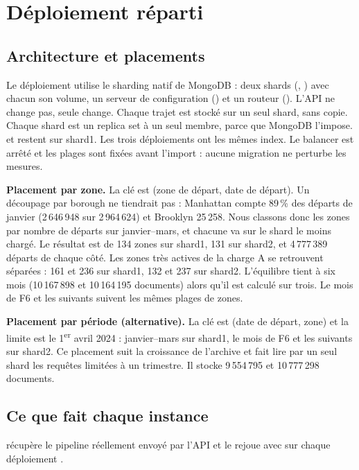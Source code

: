 \section{Déploiement réparti}\label{sec:reparti}
\subsection{Architecture et placements}
Le déploiement utilise le sharding natif de MongoDB : deux shards (,
) avec chacun son volume, un serveur de configuration () et un
routeur  (). L'API ne change pas, seule 
change. Chaque trajet est stocké sur un seul shard, sans copie. Chaque shard est un
replica set à un seul membre, parce que MongoDB l'impose.  et 
restent sur shard1. Les trois déploiements ont les mêmes index. Le balancer est arrêté
et les plages sont fixées avant l'import : aucune migration ne perturbe les mesures.

\textbf{Placement par zone.} La clé est (zone de départ, date de départ). Un découpage
par borough ne tiendrait pas : Manhattan compte 89\,\% des départs de janvier
(2\,646\,948 sur 2\,964\,624) et Brooklyn 25\,258. Nous classons donc les zones par
nombre de départs sur janvier--mars, et chacune va sur le shard le moins chargé. Le
résultat est de 134 zones sur shard1, 131 sur shard2, et 4\,777\,389 départs de chaque
côté. Les zones très actives de la charge A se retrouvent séparées : 161 et 236 sur
shard1, 132 et 237 sur shard2. L'équilibre tient à six mois (10\,167\,898 et 10\,164\,195
documents) alors qu'il est calculé sur trois. Le mois de F6 et les suivants suivent les mêmes plages de zones.

\textbf{Placement par période (alternative).} La clé est (date de départ, zone) et la
limite est le 1\textsuperscript{er} avril 2024 : janvier--mars sur shard1, le mois de F6
et les suivants sur shard2. Ce placement suit la croissance de l'archive et fait lire par un
seul shard les requêtes limitées à un trimestre. Il stocke 9\,554\,795 et 10\,777\,298 documents.



\subsection{Ce que fait chaque instance}
 récupère le pipeline réellement envoyé par l'API et le rejoue
avec  sur chaque déploiement \cite{experiences}.

